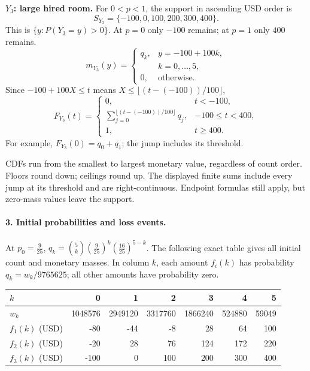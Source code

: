 \par\noindent\begin{minipage}[t]{.48\linewidth}\vspace{0pt}
\textbf{$Y_3$: large hired room.}
For $0<p<1$, the support in ascending USD order is
\[S_{Y_3}=\{-100,0,100,200,300,400\}.\]
This is $\{y:P(Y_3=y)>0\}$. At $p=0$ only $-100$ remains; at $p=1$ only $400$ remains.
\[
m_{Y_3}(y)=\begin{cases}q_k,&y=-100+100k,\\&k=0,\ldots,5,\\0,&\text{otherwise}.\end{cases}
\]
Since $-100+100X\leq t$ means $X\leq \lfloor(t-(-100))/100\rfloor$,
\[
F_{Y_3}(t)=\begin{cases}0,&t<-100,\\\displaystyle \sum_{j=0}^{\lfloor(t-(-100))/100\rfloor}q_j,&-100\leq t<400,\\1,&t\geq 400.\end{cases}
\]
For example, $F_{Y_3}(0)=q_0+q_1$; the jump includes its threshold.
\end{minipage}\par
CDFs run from the smallest to largest monetary value, regardless of count order. Floors round down; ceilings round up. The displayed finite sums include every jump at its threshold and are right-continuous. Endpoint formulas still apply, but zero-mass values leave the support.
\clearpage\paragraph{3. Initial probabilities and loss events.}
At $p_0=\frac{9}{25}$, $q_k=\binom{5}k(\frac{9}{25})^k(\frac{16}{25})^{5-k}$. The following exact table gives all initial count and monetary masses. In column $k$, each amount $f_i(k)$ has probability $q_k=w_k/9765625$; all other amounts have probability zero.
\begin{center}\begin{tabular}{lrrrrrr}\toprule
$k$ & 0 & 1 & 2 & 3 & 4 & 5\\\midrule
$w_k$ & 1048576 & 2949120 & 3317760 & 1866240 & 524880 & 59049\\
$f_1(k)$ (USD) & -80 & -44 & -8 & 28 & 64 & 100\\
$f_2(k)$ (USD) & -20 & 28 & 76 & 124 & 172 & 220\\
$f_3(k)$ (USD) & -100 & 0 & 100 & 200 & 300 & 400\\
\bottomrule\end{tabular}\end{center}
